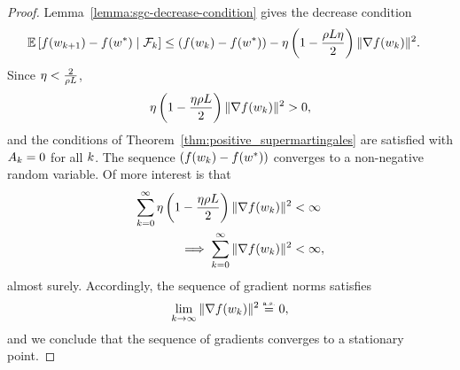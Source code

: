 \sgcAlmostSure*
\begin{proof}
    Lemma~\ref{lemma:sgc-decrease-condition} gives the decrease condition
    \begin{align*}
        \mathbb{E} \left[f(w_{k+1}) - f(w^*) \mid \mathcal{F}_k\right] &\leq \left(f(w_k) - f(w^*)\right) - \eta \left(1 - \frac{\rho L \eta}{2}\right)\|\nabla f(w_k)\|^2.
    \end{align*}
    Since \( \eta < \frac{2}{\rho L} \),
    \begin{align*}
        \eta \left(1 - \frac{\eta \rho L}{2}\right)\|\nabla f(w_k)\|^2 > 0,
    \end{align*}
    and the conditions of Theorem~\ref{thm:positive_supermartingales} are satisfied with \( A_k = 0 \) for all \( k \).
    The sequence \( \left(f(w_k) - f(w^*)\right) \) converges to a non-negative random variable.
    Of more interest is that
    \begin{align}
        \sum_{k=0}^{\infty} \eta \left(1 - \frac{\eta \rho L}{2}\right) \|\nabla f(w_k)\|^2 &< \infty \nonumber\\
        \implies \sum_{k=0}^{\infty} \|\nabla f(w_k)\|^2 &< \infty, \label{eq:stationary-convergence}
    \end{align}
    almost surely.
    Accordingly, the sequence of gradient norms satisfies
    \[ \lim_{k \rightarrow \infty} \|\nabla f(w_k)\|^2 \stackrel{\text{\rm\tiny a.s.}}{=} 0, \]
    and we conclude that the sequence of gradients converges to a stationary point.


\end{proof}
